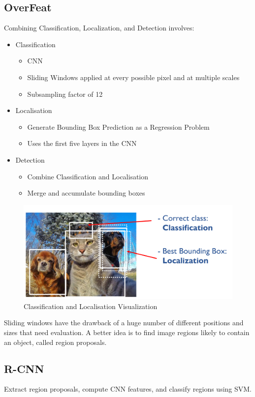 \subsection{OverFeat}
Combining Classification, Localization, and Detection involves:
\begin{itemize}
	\item Classification
	\begin{itemize}
		\item CNN
		\item Sliding Windows applied at every possible pixel and at multiple scales
		\item Subsampling factor of 12
	\end{itemize}
	\item Localisation
	\begin{itemize}
		\item Generate Bounding Box Prediction as a Regression Problem
		\item Uses the first five layers in the CNN
	\end{itemize}
	\item Detection
	\begin{itemize}
		\item Combine Classification and Localisation
		\item Merge and accumulate bounding boxes
	\end{itemize}
\end{itemize}

\begin{figure}[h]
	\centering
	\includegraphics[width=0.7\linewidth]{img/classification_localisation}
	\caption{Classification and Localisation Visualization}
	\label{fig:classificationlocalisation}
\end{figure}

Sliding windows have the drawback of a huge number of different positions and sizes that need evaluation.
A better idea is to find image regions likely to contain an object, called region proposals.

\subsection{R-CNN}
Extract region proposals, compute CNN features, and classify regions using SVM.

